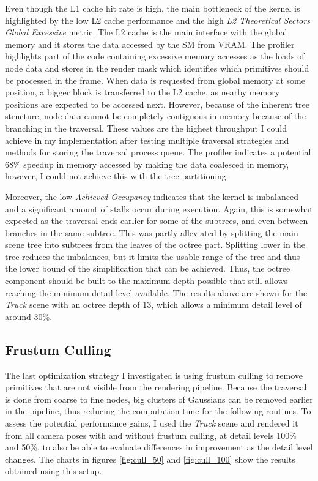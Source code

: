 Even though the L1 cache hit rate is high, the main bottleneck of the kernel is highlighted by the low L2 cache performance and the high \textit{L2 Theoretical Sectors Global Excessive} metric. The L2 cache is the main interface with the global memory and it stores the data accessed by the SM from VRAM. The profiler highlights part of the code containing excessive memory accesses as the loads of node data and stores in the render mask which identifies which primitives should be processed in the frame. When data is requested from global memory at some position, a bigger block is transferred to the L2 cache, as nearby memory positions are expected to be accessed next. However, because of the inherent tree structure, node data cannot be completely contiguous in memory because of the branching in the traversal. These values are the highest throughput I could achieve in my implementation after testing multiple traversal strategies and methods for storing the traversal process queue. The profiler indicates a potential 68\% speedup in memory accessed by making the data coalesced in memory, however, I could not achieve this with the tree partitioning.

Moreover, the low \textit{Achieved Occupancy} indicates that the kernel is imbalanced and a significant amount of stalls occur during execution. Again, this is somewhat expected as the traversal ends earlier for some of the subtrees, and even between branches in the same subtree. This was partly alleviated by splitting the main scene tree into subtrees from the leaves of the octree part. Splitting lower in the tree reduces the imbalances, but it limits the usable range of the tree and thus the lower bound of the simplification that can be achieved. Thus, the octree component should be built to the maximum depth possible that still allows reaching the minimum detail level available. The results above are shown for the \textit{Truck} scene with an octree depth of 13, which allows a minimum detail level of around 30\%.

\subsection{Frustum Culling}
The last optimization strategy I investigated is using frustum culling to remove primitives that are not visible from the rendering pipeline. Because the traversal is done from coarse to fine nodes, big clusters of Gaussians can be removed earlier in the pipeline, thus reducing the computation time for the following routines. To assess the potential performance gains, I used the \textit{Truck} scene and rendered it from all camera poses with and without frustum culling, at detail levels 100\% and 50\%, to also be able to evaluate differences in improvement as the detail level changes. The charts in figures \ref{fig:cull_50} and \ref{fig:cull_100} show the results obtained using this setup.

